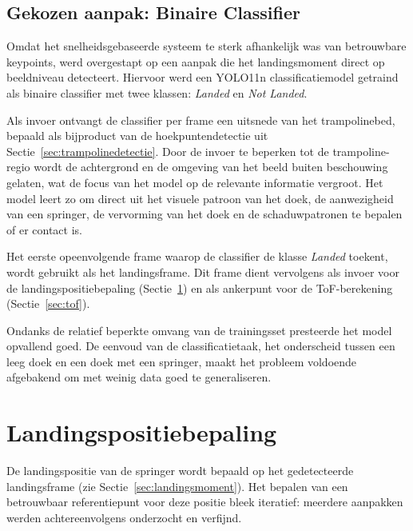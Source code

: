 \subsection{Gekozen aanpak: Binaire Classifier}
\label{subsec:landingsmoment-classifier}

Omdat het snelheidsgebaseerde systeem te sterk afhankelijk was van betrouwbare keypoints, werd overgestapt op een aanpak die het landingsmoment direct op beeldniveau detecteert. Hiervoor werd een YOLO11n classificatiemodel \autocite{Jocher_Ultralytics_YOLO_2023} getraind als binaire classifier met twee klassen: \textit{Landed} en \textit{Not Landed}.

Als invoer ontvangt de classifier per frame een uitsnede van het trampolinebed, bepaald als bijproduct van de hoekpuntendetectie uit Sectie~\ref{sec:trampolinedetectie}. Door de invoer te beperken tot de trampoline-regio wordt de achtergrond en de omgeving van het beeld buiten beschouwing gelaten, wat de focus van het model op de relevante informatie vergroot. Het model leert zo om direct uit het visuele patroon van het doek, de aanwezigheid van een springer, de vervorming van het doek en de schaduwpatronen te bepalen of er contact is.

Het eerste opeenvolgende frame waarop de classifier de klasse \textit{Landed} toekent, wordt gebruikt als het landingsframe. Dit frame dient vervolgens als invoer voor de landingspositiebepaling (Sectie~\ref{sec:landingspositie}) en als ankerpunt voor de ToF-berekening (Sectie~\ref{sec:tof}).

Ondanks de relatief beperkte omvang van de trainingsset presteerde het model opvallend goed. De eenvoud van de classificatietaak, het onderscheid tussen een leeg doek en een doek met een springer, maakt het probleem voldoende afgebakend om met weinig data goed te generaliseren.


\section{Landingspositiebepaling}
\label{sec:landingspositie}

De landingspositie van de springer wordt bepaald op het gedetecteerde landingsframe (zie Sectie~\ref{sec:landingsmoment}). Het bepalen van een betrouwbaar referentiepunt voor deze positie bleek iteratief: meerdere aanpakken werden achtereenvolgens onderzocht en verfijnd.

